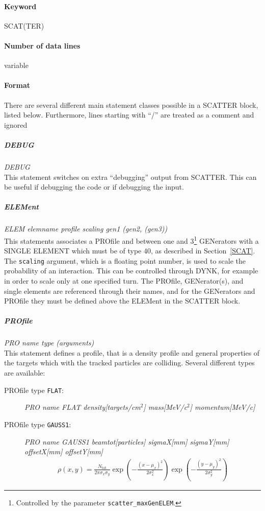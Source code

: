 \paragraph{Keyword} SCAT(TER)

\paragraph{Number of data lines} variable

\paragraph{Format}
There are several different main statement classes possible in a SCATTER block, listed below.
Furthermore, lines starting with ``/'' are treated as a comment and ignored

\subparagraph{DEBUG} \emph{DEBUG}\\
This statement switches on extra ``debugging'' output from SCATTER.
This can be useful if debugging the code or if debugging the input.

\subparagraph{ELEMent} \emph{ELEM elemname profile scaling gen1 (gen2, (gen3))}\\
This statements associates a PROfile and between one and 3\footnote{Controlled by the parameter \texttt{scatter\_maxGenELEM}.} GENerators with a SINGLE ELEMENT which must be of type 40, as described in Section~\ref{SCAT}.
The \texttt{scaling} argument, which is a floating point number, is used to scale the probability of an interaction.
This can be controlled through DYNK, for example in order to scale only at one specified turn.
The PROfile, GENerator(s), and single elements are referenced through their names, and for the GENerators and PROfile they must be defined above the ELEMent in the SCATTER block.

\subparagraph{PROfile} \emph{PRO name type (arguments)} \\
This statement defines a profile, that is a density profile and general properties of the targets which with the tracked particles are colliding.
Several different types are available:
\begin{description}
\item[PROfile type \texttt{FLAT}:]\emph{PRO name FLAT density[targets/cm$^2$] mass[MeV/c$^2$] momentum[MeV/c]}
\item[PROfile type \texttt{GAUSS1}:]\emph{PRO name GAUSS1 beamtot[particles] sigmaX[mm] sigmaY[mm] offsetX[mm] offsetY[mm]}
\begin{align}
    \rho(x,y) = \frac{N_{\mathrm{tot}}}{2\pi\sigma_x\sigma_y}
                \exp\left(-\frac{(x-\mu_x)^2}{2\sigma_x^2}\right)
                \exp\left(-\frac{(y-\mu_y)^2}{2\sigma_y^2}\right)
\end{align}
\end{description}

